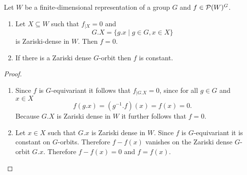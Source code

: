 \begin{lem}\label{lem: zariski density orbits}
  Let $W$ be a finite-dimensional representation of a group $G$ and $f \in \mathcal{P}(W)^G$.
  \begin{enumerate}[label=\emph{\alph*)},leftmargin=*]
    \item
      Let $X \subseteq W$ such that $f_{|X} = 0$ and
      \[
          G.X
        = \{
            g.x
          \mid
            g \in G,
            x \in X
          \}
      \]
      is Zariski-dense in $W$.
      Then $f = 0$.
    \item
      If there is a Zariski dense $G$-orbit then $f$ is constant.
  \end{enumerate}
\end{lem}
\begin{proof}
  \begin{enumerate}[label=\emph{\alph*)},leftmargin=*]
    \item
      Since $f$ is $G$-equivariant it follows that $f_{|G.X} = 0$, since for all $g \in G$ and $x \in X$
      \[
          f(g.x)
        = \left( g^{-1}.f \right)(x)
        = f(x)
        = 0.
      \]
      Because $G.X$ is Zariski dense in $W$ it further follows that $f = 0$.
    \item
      Let $x \in X$ such that $G.x$ is Zariski dense in $W$.
      Since $f$ is $G$-equivariant it is constant on $G$-orbits.
      Therefore $f - f(x)$ vanishes on the Zariski dense $G$-orbit $G.x$.
      Therefore $f - f(x) = 0$ and $f = f(x)$.
    \qedhere
  \end{enumerate}
\end{proof}


